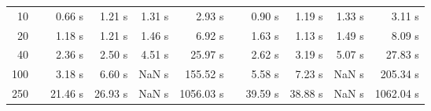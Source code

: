 {\begin{table}[h]
\begin{tabular}{rr rrrr r rrrr}
10 & & 0.66 s & 1.21 s & 1.31 s & 2.93 s && 0.90 s & 1.19 s & 1.33 s & 3.11 s \\ 
20 & & 1.18 s & 1.21 s & 1.46 s & 6.92 s && 1.63 s & 1.13 s & 1.49 s & 8.09 s \\ 
40 & & 2.36 s & 2.50 s & 4.51 s & 25.97 s && 2.62 s & 3.19 s & 5.07 s & 27.83 s \\ 
100 & & 3.18 s & 6.60 s &  NaN s & 155.52 s && 5.58 s & 7.23 s &  NaN s & 205.34 s \\ 
250 & & 21.46 s & 26.93 s &  NaN s & 1056.03 s && 39.59 s & 38.88 s &  NaN s & 1062.04 s \\ 
\hline 
\end{tabular} 
\end{table} 
} 
